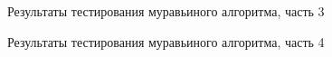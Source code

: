 \clearpage
\begin{figure}[h!]
	
	
	\caption{Результаты тестирования муравьиного алгоритма, часть 3}
	
	\label{fig:x3}
	
\end{figure}


\clearpage
\begin{figure}[h!]
	
	
	\caption{Результаты тестирования муравьиного алгоритма, часть 4}
	
	\label{fig:x4}
	
\end{figure}

